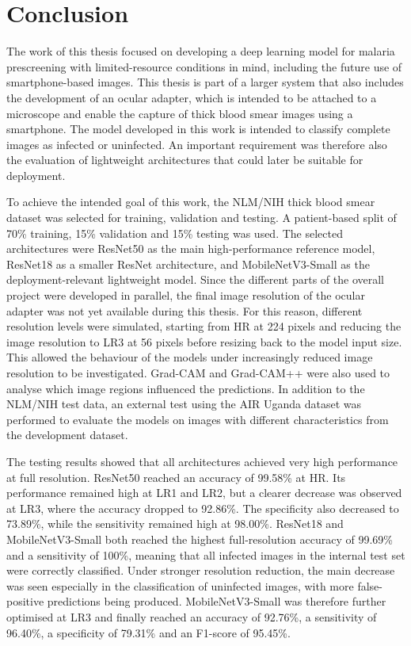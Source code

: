 \chapter{Conclusion}
\label{chap:conclusion}

The work of this thesis focused on developing a deep learning model for malaria prescreening with limited-resource conditions in mind, including the future use of smartphone-based images. This thesis is part of a larger system that also includes the development of an ocular adapter, which is intended to be attached to a microscope and enable the capture of thick blood smear images using a smartphone. The model developed in this work is intended to classify complete images as infected or uninfected. An important requirement was therefore also the evaluation of lightweight architectures that could later be suitable for deployment.

To achieve the intended goal of this work, the NLM/NIH thick blood smear dataset was selected for training, validation and testing. A patient-based split of 70\% training, 15\% validation and 15\% testing was used. The selected architectures were ResNet50 as the main high-performance reference model, ResNet18 as a smaller ResNet architecture, and MobileNetV3-Small as the deployment-relevant lightweight model. Since the different parts of the overall project were developed in parallel, the final image resolution of the ocular adapter was not yet available during this thesis. For this reason, different resolution levels were simulated, starting from HR at 224 pixels and reducing the image resolution to LR3 at 56 pixels before resizing back to the model input size. This allowed the behaviour of the models under increasingly reduced image resolution to be investigated. Grad-CAM and Grad-CAM++ were also used to analyse which image regions influenced the predictions. In addition to the NLM/NIH test data, an external test using the AIR Uganda dataset was performed to evaluate the models on images with different characteristics from the development dataset.

The testing results showed that all architectures achieved very high performance at full resolution. ResNet50 reached an accuracy of 99.58\% at HR. Its performance remained high at LR1 and LR2, but a clearer decrease was observed at LR3, where the accuracy dropped to 92.86\%. The specificity also decreased to 73.89\%, while the sensitivity remained high at 98.00\%. ResNet18 and MobileNetV3-Small both reached the highest full-resolution accuracy of 99.69\% and a sensitivity of 100\%, meaning that all infected images in the internal test set were correctly classified. Under stronger resolution reduction, the main decrease was seen especially in the classification of uninfected images, with more false-positive predictions being produced. MobileNetV3-Small was therefore further optimised at LR3 and finally reached an accuracy of 92.76\%, a sensitivity of 96.40\%, a specificity of 79.31\% and an F1-score of 95.45\%.


